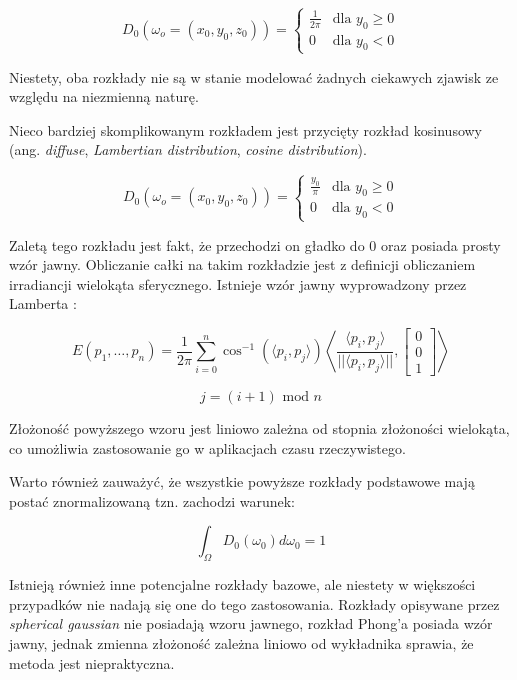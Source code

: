 \documentclass[../main.tex]{subfiles}
\begin{document}
$$
D_0(\omega_o=(x_0, y_0, z_0)) = \begin{cases}
  \frac{1}{2\pi} & \text{dla } y_0 \geq 0 \\
  0 & \text{dla } y_0 < 0
\end{cases}
$$

Niestety, oba rozkłady nie są w stanie modelować żadnych ciekawych zjawisk
ze względu na niezmienną naturę.

Nieco bardziej skomplikowanym rozkładem jest przycięty rozkład kosinusowy (ang.
\textit{diffuse}, \textit{Lambertian distribution}, \textit{cosine
distribution}).

$$
D_0(\omega_o=(x_0, y_0, z_0)) = \begin{cases}
  \frac{y_0}{\pi} & \text{dla } y_0 \geq 0 \\
  0 & \text{dla } y_0 < 0
\end{cases}
$$

Zaletą tego rozkładu jest fakt, że przechodzi on gładko do 0 oraz posiada
prosty wzór jawny. Obliczanie całki na takim rozkładzie jest z definicji
obliczaniem irradiancji wielokąta sferycznego. Istnieje wzór jawny
wyprowadzony przez Lamberta \cite{Baum}:

$$
E(p_1, \ldots, p_n) =
\frac{1}{2\pi}
\sum_{i=0}^{n} {
  \cos^{-1}(\langle p_i, p_j \rangle)
  \left\langle {
    \frac{\langle p_i, p_j \rangle}{||\langle p_i, p_j \rangle||},
    \left[ \begin{matrix} 0 \\ 0 \\ 1 \end{matrix} \right]
  } \right\rangle
}
$$

$$
j = (i+1) \text{ mod } n
$$

Złożoność powyższego wzoru jest liniowo zależna od stopnia złożoności
wielokąta, co umożliwia zastosowanie go w aplikacjach czasu rzeczywistego.

Warto również zauważyć, że wszystkie powyższe rozkłady podstawowe mają
postać znormalizowaną tzn. zachodzi warunek:

$$
\int_\Omega {
  D_0(\omega_0)
  d \omega_0
} = 1
$$

Istnieją również inne potencjalne rozkłady bazowe, ale niestety
w większości przypadków nie nadają się one do tego zastosowania. Rozkłady
opisywane przez \textit{spherical gaussian} nie posiadają wzoru jawnego, rozkład
Phong’a posiada wzór jawny, jednak zmienna złożoność zależna liniowo od
wykładnika sprawia, że metoda jest niepraktyczna.

\end{document}
